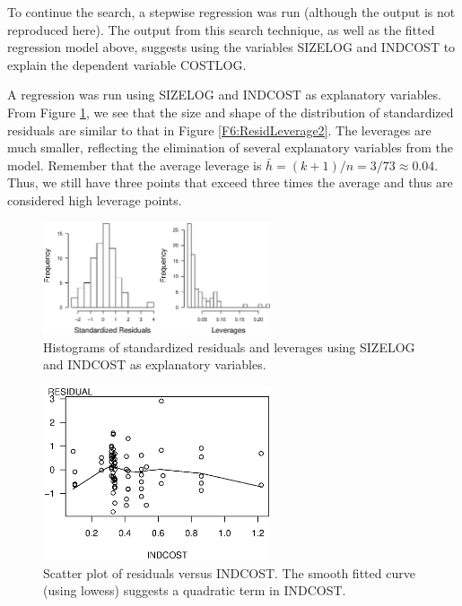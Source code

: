 To continue the search, a stepwise regression was run (although the
output is not reproduced here). The output from this search
technique, as well as the fitted regression model above, suggests
using the variables SIZELOG and INDCOST to explain the dependent
variable COSTLOG.

A regression was run using SIZELOG and INDCOST as explanatory
variables. From Figure \ref{F6:ResidLeverage3}, we see that the size
and shape of the distribution of standardized residuals are similar
to that in Figure \ref{F6:ResidLeverage2}. The leverages are much
smaller, reflecting the elimination of several explanatory variables
from the model. Remember that the average leverage is $\bar{h}%
=(k+1)/n=3/73\approx 0.04$. Thus, we still have three points that exceed
three times the average and thus are considered high leverage points.


\begin{figure}[htp]
  \begin{center}
   \includegraphics[width=0.6\textwidth]{Chapter6/F6ResidLeverage3.eps}
    \caption{\label{F6:ResidLeverage3} \small {Histograms of
    standardized residuals and leverages using SIZELOG and INDCOST
    as explanatory variables.}}
  \end{center}
\end{figure}


\begin{figure}[htp]
  \begin{center}
   \includegraphics[width=0.6\textwidth]{Chapter6/F6SurveyQuad.eps}
    \caption{\label{F6:SurveyQuad} \small {Scatter plot of residuals versus INDCOST.
    The smooth fitted curve (using lowess) suggests a quadratic term in INDCOST.}}
  \end{center}
\end{figure}



